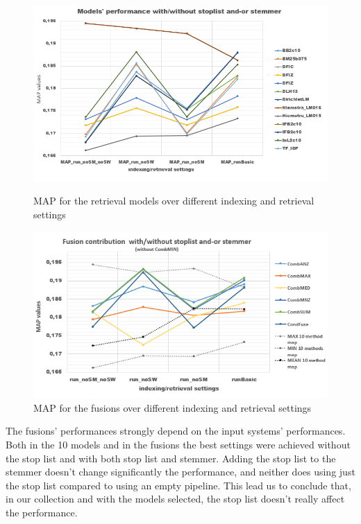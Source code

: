{	\begin{figure}[H]
		\begin{minipage}{0.5\linewidth}
			\centering
			\includegraphics[width=\linewidth]{../eval/results-img-graphs/MAPModSMSW.png}
			\caption{MAP for the retrieval models over different indexing and retrieval settings}				
			\label{fig:MAPMod}
		\end{minipage}
		\begin{minipage}{0.5\linewidth}
			\centering
			\includegraphics[width=\linewidth]{../eval/results-img-graphs/MAPFusSMSW.png}
			\caption{MAP for the fusions over different indexing and retrieval settings}				
			\label{fig:MAPFus}
		\end{minipage}
	\end{figure}

	The fusions' performances strongly depend on the input systems' performances. Both in the 10 models and in the fusions the best settings were achieved without the stop list and with both stop list and stemmer.
	Adding the stop list to the stemmer doesn't change significantly the performance, and neither does using just the stop list compared to using an empty pipeline.
	This lead us to conclude that, in our collection and with the models selected, the stop list doesn't really affect the performance.
	
}
